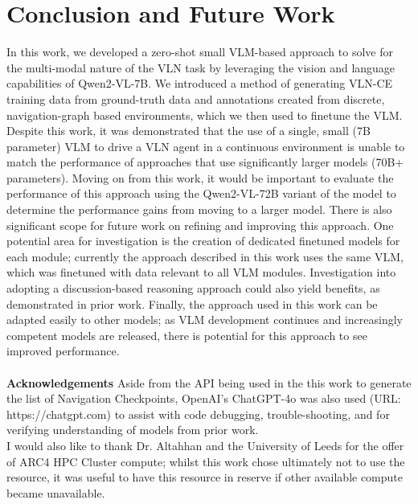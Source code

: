 \documentclass{svproc}
\begin{document}
\section{Conclusion and Future Work}
    In this work, we developed a zero-shot small VLM-based approach to solve for the multi-modal nature of the VLN task by leveraging the vision and language capabilities of Qwen2-VL-7B. We introduced a method of generating VLN-CE training data from ground-truth data and annotations created from discrete, navigation-graph based environments, which we then used to finetune the VLM. Despite this work, it was demonstrated that the use of a single, small (7B parameter) VLM to drive a VLN agent in a continuous environment is unable to match the performance of approaches that use significantly larger models (70B+ parameters). Moving on from this work, it would be important to evaluate the performance of this approach using the Qwen2-VL-72B variant of the model to determine the performance gains from moving to a larger model. There is also significant scope for future work on refining and improving this approach. One potential area for investigation is the creation of dedicated finetuned models for each module; currently the approach described in this work uses the same VLM, which was finetuned with data relevant to all VLM modules. Investigation into adopting a discussion-based reasoning approach could also yield benefits, as demonstrated in prior work.
    Finally, the approach used in this work can be adapted easily to other models; as VLM development continues and increasingly competent models are released, there is potential for this approach to see improved performance.
    \\ \\
    \textbf{Acknowledgements}  Aside from the API being used in the this work to generate the list of Navigation Checkpoints, OpenAI's ChatGPT-4o was also used (URL: https://chatgpt.com) to assist with code debugging, trouble-shooting, and for verifying understanding of models from prior work.
    \\ I would also like to thank Dr. Altahhan and the University of Leeds for the offer of ARC4 HPC Cluster compute; whilst this work chose ultimately not to use the resource, it was useful to have this resource in reserve if other available compute became unavailable.

\printbibliography 
\end{document}
